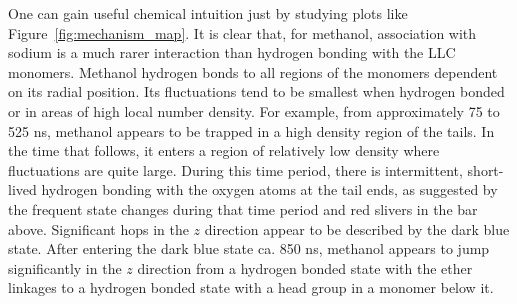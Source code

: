 \documentclass[journal=jpcbfk,manuscript=article]{achemso}
\begin{document}

  One can gain useful chemical intuition just by studying plots like 
  Figure~\ref{fig:mechanism_map}. It is clear that, for methanol, association 
  with sodium is a much rarer interaction than hydrogen bonding with the 
  LLC monomers. Methanol hydrogen bonds to all regions of the monomers dependent
  on its radial position. Its fluctuations tend to be smallest when hydrogen bonded
  or in areas of high local number density. For example, from approximately 75 to 
  525 ns, methanol appears to be trapped in a high density region of the tails.
  In the time that follows, it enters a region of relatively low density where 
  fluctuations are quite large. During this time period, there is intermittent, 
  short-lived hydrogen bonding with the oxygen atoms at the tail ends, as suggested
  by the frequent state changes during that time period and red slivers in the bar
  above. Significant hops in the $z$ direction appear to be described by the dark blue
  state. After entering the dark blue state ca. 850 ns, methanol appears to jump
  significantly in the $z$ direction from a hydrogen bonded state with the ether 
  linkages to a hydrogen bonded state with a head group in a monomer below it.

  
\end{document}
